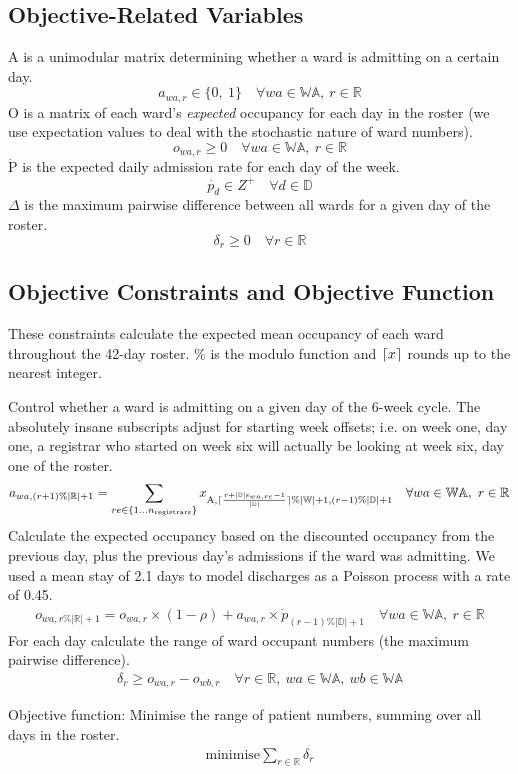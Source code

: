 \documentclass[a4paper]{article}
\DeclarePairedDelimiter{\ceil}{\lceil}{\rceil}
\begin{document}
\subsection{Objective-Related Variables}

A is a unimodular matrix determining whether a ward is admitting on a certain day.
$$a_{wa, r} \in \{0,\ 1\} \quad\forall wa\in \mathbb{WA},\ r\in \mathbb{R}$$
O is a matrix of each ward's \emph{expected} occupancy for each day in the roster (we use expectation values to deal with the stochastic nature of ward numbers).
$$o_{wa, r} \ge 0 \quad\forall wa\in \mathbb{WA},\ r\in \mathbb{R}$$
$\dot{\text{P}}$ is the expected daily admission rate for each day of the week.
$$\dot{p_{d}} \in Z^+ \quad\forall d\in \mathbb{D}$$
$\Delta$ is the maximum pairwise difference between all wards for a given day of the roster.
$$\delta_r \ge 0 \quad\forall r \in \mathbb{R}$$

\subsection{Objective Constraints and Objective Function}

These constraints calculate the expected mean occupancy of each ward throughout the 42-day roster. $\%$ is the modulo function and $\ceil{x}$ rounds up to the nearest integer.

Control whether a ward is admitting on a given day of the 6-week cycle. The absolutely insane subscripts adjust for starting week offsets; i.e. on week one, day one, a registrar who started on week six will actually be looking at week six, day one of the roster.
\begin{align}
  a_{wa, (r+1)\%|\mathbb{R}|+1} = \sum_{re\in \{1\dots n_\text{registrars}\}}{x_{\text{A}, \ceil{\frac{r+|\mathbb{D}|\text{s}_{wa, re}-1}{|\mathbb{D}|}} \% |\mathbb{W}|+1, (r-1) \% |\mathbb{D}|+1}} \quad\forall wa \in \mathbb{WA},\ r \in \mathbb{R}
\end{align}
Calculate the expected occupancy based on the discounted occupancy from the previous day, plus the previous day's admissions if the ward was admitting. We used a mean stay of 2.1 days to model discharges as a Poisson process with a rate of 0.45.
\begin{align}
  o_{wa, r\%|\mathbb{R}|+1} = o_{wa, r} \times (1-\rho) + a_{wa, r} \times \dot{p}_{(r-1)\%|\mathbb{D}|+1} \quad\forall wa \in \mathbb{WA},\ r \in \mathbb{R}
\end{align}
For each day calculate the range of ward occupant numbers (the maximum pairwise difference).
\begin{align}
  \delta_r \ge o_{wa, r} - o_{wb, r} \quad\forall r \in \mathbb{R},\ wa \in \mathbb{WA},\ wb \in \mathbb{WA}
\end{align}

\begin{framed}
Objective function: Minimise the range of patient numbers, summing over all days in the roster.
\begin{align}
  \text{minimise} \sum_{r\in \mathbb{R}}{\delta_r}
\end{align}
\end{framed}
\end{document}
